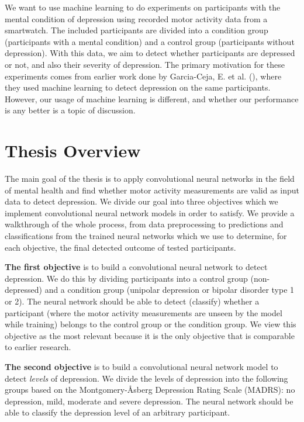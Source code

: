 We want to use machine learning to do experiments on participants with the mental condition of depression using recorded motor activity data from a smartwatch. The included participants are divided into a condition group (participants with a mental condition) and a control group (participants without depression). With this data, we aim to detect whether participants are depressed or not, and also their severity of depression. The primary motivation for these experiments comes from earlier work done by Garcia-Ceja, E. et al. (\cite{GarciaCeja2018_classification_bipolar}), where they used machine learning to detect depression on the same participants. However, our usage of machine learning is different, and whether our performance is any better is a topic of discussion.

\section{Thesis Overview}
The main goal of the thesis is to apply convolutional neural networks in the field of mental health and find whether motor activity measurements are valid as input data to detect depression. We divide our goal into three objectives which we implement convolutional neural network models in order to satisfy. We provide a walkthrough of the whole process, from data preprocessing to predictions and classifications from the trained neural networks which we use to determine, for each objective, the final detected outcome of tested participants.

\textbf{The first objective} is to build a convolutional neural network to detect depression. We do this by dividing participants into a control group (non-depressed) and a condition group (unipolar depression or bipolar disorder type 1 or 2). The neural network should be able to detect (classify) whether a participant (where the motor activity measurements are unseen by the model while training) belongs to the control group or the condition group. We view this objective as the most relevant because it is the only objective that is comparable to earlier research.

\textbf{The second objective} is to build a convolutional neural network model to detect \textit{levels} of depression. We divide the levels of depression into the following groups based on the Montgomery-Åsberg Depression Rating Scale (MADRS): no depression, mild, moderate and severe depression. The neural network should be able to classify the depression level of an arbitrary participant.


